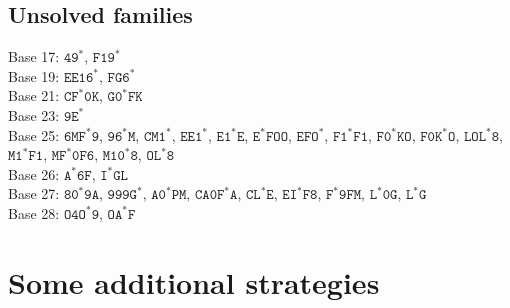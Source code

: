 \documentclass[12pt]{article}
\theoremstyle{plain}
\theoremstyle{definition}
\theoremstyle{remark}
\newcommand{\0}{\mathtt{0}}
\newcommand{\1}{\mathtt{1}}
\newcommand{\2}{\mathtt{2}}
\newcommand{\3}{\mathtt{3}}
\newcommand{\4}{\mathtt{4}}
\newcommand{\5}{\mathtt{5}}
\newcommand{\6}{\mathtt{6}}
\newcommand{\7}{\mathtt{7}}
\newcommand{\8}{\mathtt{8}}
\newcommand{\9}{\mathtt{9}}
\begin{document}
\subsection{Unsolved families}
Base 17: $\mathtt{49^*}$, $\mathtt{F19^*}$ \\
Base 19: $\mathtt{EE16^*}$, $\mathtt{FG6^*}$ \\
Base 21: $\mathtt{CF^*0K}$, $\mathtt{G0^*FK}$ \\
Base 23: $\mathtt{9E^*}$ \\
Base 25: $\mathtt{6MF^*9}$, $\mathtt{96^*M}$, $\mathtt{CM1^*}$, $\mathtt{EE1^*}$, $\mathtt{E1^*E}$, $\mathtt{E^*FOO}$, $\mathtt{EFO^*}$, $\mathtt{F1^*F1}$, $\mathtt{F0^*KO}$, $\mathtt{F0K^*O}$, $\mathtt{LOL^*8}$, $\mathtt{M1^*F1}$, $\mathtt{MF^*0F6}$, $\mathtt{M10^*8}$, $\mathtt{OL^*8}$ \\
Base 26: $\mathtt{A^*6F}$, $\mathtt{I^*GL}$ \\
Base 27: $\mathtt{80^*9A}$, $\mathtt{999G^*}$, $\mathtt{A0^*PM}$, $\mathtt{CA0F^*A}$, $\mathtt{CL^*E}$, $\mathtt{EI^*F8}$, $\mathtt{F^*9FM}$, $\mathtt{L^*0G}$, $\mathtt{L^*G}$ \\
Base 28: $\mathtt{O4O^*9}$, $\mathtt{OA^*F}$

\section{Some additional strategies}
\end{document}
